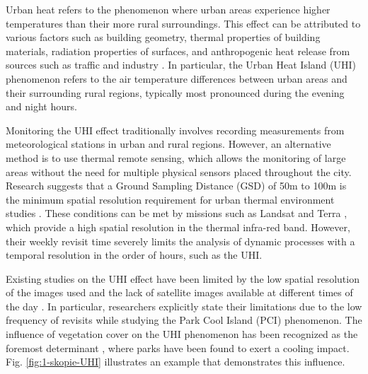     Urban heat refers to the phenomenon where urban areas experience higher temperatures than their more rural surroundings.
    This effect can be attributed to various factors such as building geometry, thermal properties of building materials, radiation properties of surfaces, and anthropogenic heat release from sources such as traffic and industry \cite{deilami2018urban}. 
    In particular,  the Urban Heat Island (UHI) phenomenon refers to the air temperature differences between urban areas and their surrounding rural regions, typically most pronounced during the evening and night hours. 

    Monitoring the UHI effect traditionally involves recording measurements from meteorological stations in urban and rural regions.
    However, an alternative method is to use thermal remote sensing, which allows the monitoring of large areas without the need for multiple physical sensors placed throughout the city.
    Research suggests that a Ground Sampling Distance (GSD) of 50m to 100m is the minimum spatial resolution requirement for urban thermal environment studies \cite{mohamed2017land, sobrino2012impact, huang2013generating}. 
    These conditions can be met by missions such as Landsat \cite{USGS2023Landsat} and Terra \cite{terra_nasa}, which provide a high spatial resolution in the thermal infra-red band.
    However, their weekly revisit time severely limits the analysis of dynamic processes with a temporal resolution in the order of hours, such as the UHI. 

    Existing studies on the UHI effect have been limited by the low spatial resolution of the images used and the lack of satellite images available at different times of the day \cite{Zhu2021, Shi2019}. 
    In particular, researchers explicitly state their limitations \cite{Shi2019} due to the low frequency of revisits while studying the Park Cool Island (PCI) \cite{Yang2017} phenomenon. 
    The influence of vegetation cover on the UHI phenomenon has been recognized as the foremost determinant \cite{deilami2018urban}, where parks have been found to exert a cooling impact.
    Fig. \ref{fig:1-skopie-UHI} illustrates an example that demonstrates this influence. 
    
